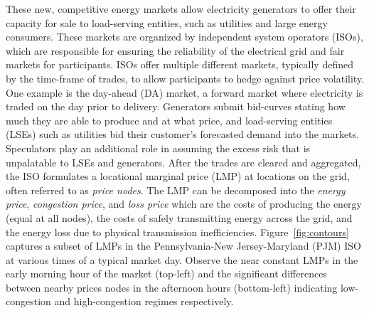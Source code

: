 These new, competitive energy markets allow electricity generators to offer their capacity for sale to load-serving
entities, such as utilities and large energy consumers.
These markets are organized by independent system operators (ISOs), which are responsible for ensuring the reliability
of the electrical grid and fair markets for participants.
ISOs offer multiple different markets, typically defined by the time-frame of trades, to allow participants to hedge
against price volatility.
One example is the day-ahead (DA) market, a forward market where electricity is traded on the day prior to delivery.
Generators submit bid-curves stating how much they are able to produce and at what price, and load-serving
entities (LSEs) such as utilities bid their customer's forecasted demand into the markets.
Speculators play an additional role in assuming the excess risk that is unpalatable to LSEs and generators.
After the trades are cleared and aggregated, the ISO formulates a locational marginal price (LMP) at locations on the
grid, often referred to as \textit{price nodes}.
The LMP can be decomposed into the \textit{energy price}, \textit{congestion price}, and \textit{loss price} which are
the costs of producing the energy (equal at all nodes), the costs of safely transmitting energy across the grid,
and the energy loss due to physical transmission inefficiencies.
Figure~\ref{fig:contours} captures a subset of LMPs in the Pennsylvania-New Jersey-Maryland (PJM) ISO at various times
of a typical market day.
Observe the near constant LMPs in the early morning hour of the market (top-left) and the significant differences
between nearby prices nodes in the afternoon hours (bottom-left) indicating low-congestion and high-congestion
regimes respectively.

